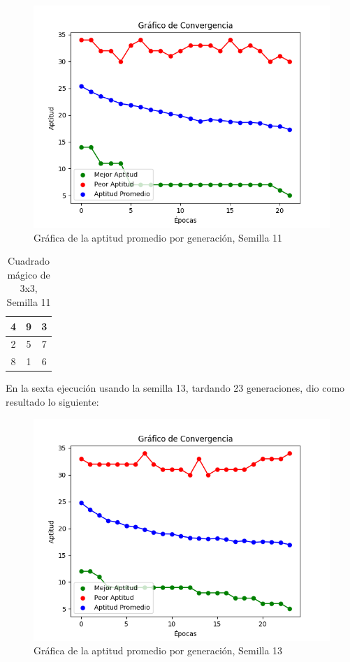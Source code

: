 \documentclass{report}
\begin{document}
    \begin{figure}[H]
        \centering
        \includegraphics[scale=0.5]{Grafica5.png}
        \caption{Gráfica de la aptitud promedio por generación, Semilla 11}
    \end{figure}
    \begin{table}[H]
        \centering
        \begin{tabular}{|c|c|c|}
            \hline
            4 & 9 & 3\\
            \hline
            2 & 5 & 7\\
            \hline
            8 & 1 & 6\\
            \hline
        \end{tabular}
        \caption{Cuadrado mágico de 3x3, Semilla 11}
    \end{table}
    En la sexta ejecución usando la semilla 13, tardando 23 generaciones, dio como resultado lo siguiente:
    \begin{figure}[H]
        \centering
        \includegraphics[scale=0.5]{Grafica6.png}
        \caption{Gráfica de la aptitud promedio por generación, Semilla 13}
    \end{figure}
\end{document}
